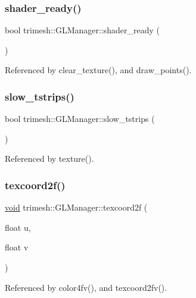 \subsubsection{\texorpdfstring{shader\+\_\+ready()}{shader\_ready()}}
{\footnotesize\ttfamily bool trimesh\+::\+G\+L\+Manager\+::shader\+\_\+ready (\begin{DoxyParamCaption}{ }\end{DoxyParamCaption})}



Referenced by clear\+\_\+texture(), and draw\+\_\+points().

\mbox{\label{classtrimesh_1_1GLManager_af32d8d8e06cecc35ec9c711f4fb8d4b7}} 
\subsubsection{\texorpdfstring{slow\+\_\+tstrips()}{slow\_tstrips()}}
{\footnotesize\ttfamily bool trimesh\+::\+G\+L\+Manager\+::slow\+\_\+tstrips (\begin{DoxyParamCaption}{ }\end{DoxyParamCaption})}



Referenced by texture().

\mbox{\label{classtrimesh_1_1GLManager_a6676fac0d3c90e7f4ef480f2290316f1}} 
\subsubsection{\texorpdfstring{texcoord2f()}{texcoord2f()}}
{\footnotesize\ttfamily \hyperlink{namespacetrimesh_a784ddfd979e1c579bda795a8edfc3f43}{void} trimesh\+::\+G\+L\+Manager\+::texcoord2f (\begin{DoxyParamCaption}\item[{float}]{u,  }\item[{float}]{v }\end{DoxyParamCaption})}



Referenced by color4fv(), and texcoord2fv().

